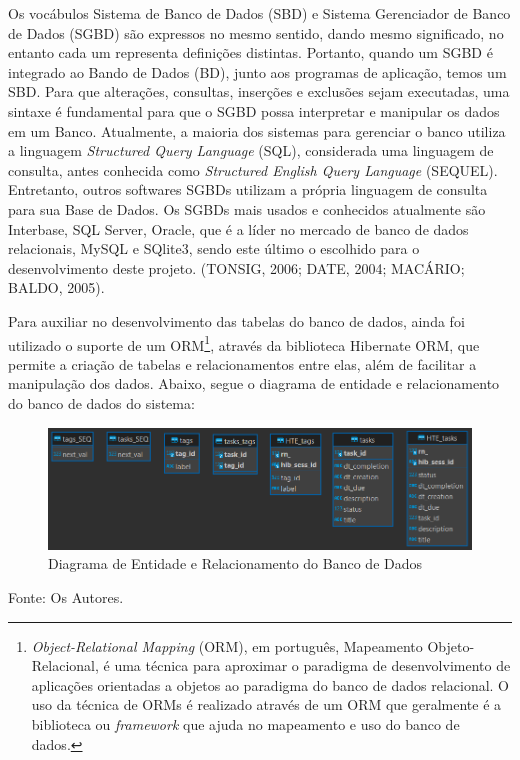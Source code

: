 \documentclass[a4paper,12pt]{article}
\begin{document}
Os vocábulos Sistema de Banco de Dados (SBD) e Sistema Gerenciador de Banco de Dados (SGBD) são expressos no mesmo sentido, dando mesmo 
significado, no entanto cada um representa definições distintas. Portanto, quando um SGBD é integrado ao Bando de Dados (BD), junto aos 
programas de aplicação, temos um SBD. Para que alterações, consultas, inserções e exclusões sejam executadas, uma sintaxe é fundamental 
para que o SGBD possa interpretar e manipular os dados em um Banco. Atualmente, a maioria dos sistemas para gerenciar o banco utiliza a 
linguagem \textit{Structured Query Language} (SQL), considerada uma linguagem de consulta, antes conhecida 
como \textit{Structured English Query Language} (SEQUEL). Entretanto, outros softwares SGBDs utilizam a própria linguagem de 
consulta para sua Base de Dados. Os SGBDs mais usados e 
conhecidos atualmente são Interbase, SQL Server, Oracle, que é a líder no mercado de banco de dados relacionais, 
MySQL e SQlite3, sendo este último o escolhido para o desenvolvimento deste projeto. (TONSIG, 2006; DATE, 2004; MACÁRIO; BALDO, 2005). 

Para auxiliar no desenvolvimento das tabelas do banco de dados, ainda foi utilizado o suporte de um ORM\footnote{
	\textit{Object-Relational Mapping} (ORM), em português, Mapeamento Objeto-Relacional, é uma técnica para aproximar o paradigma de desenvolvimento de aplicações orientadas a objetos ao paradigma do banco de dados relacional. O uso da técnica de ORMs é realizado através de um ORM que geralmente é a biblioteca ou \textit{framework} que ajuda no mapeamento e uso do banco de dados.
}, através da biblioteca Hibernate ORM, que permite a criação de tabelas e relacionamentos entre elas, além de facilitar a manipulação dos dados. Abaixo, segue o diagrama de entidade e relacionamento do banco de dados do sistema:
\begin{figure}[H]
	\centering
	\includegraphics[scale=0.80]{database/database-diagram.png}
	\caption{Diagrama de Entidade e Relacionamento do Banco de Dados}
\end{figure}
\noindent Fonte: Os Autores.


\end{document}

